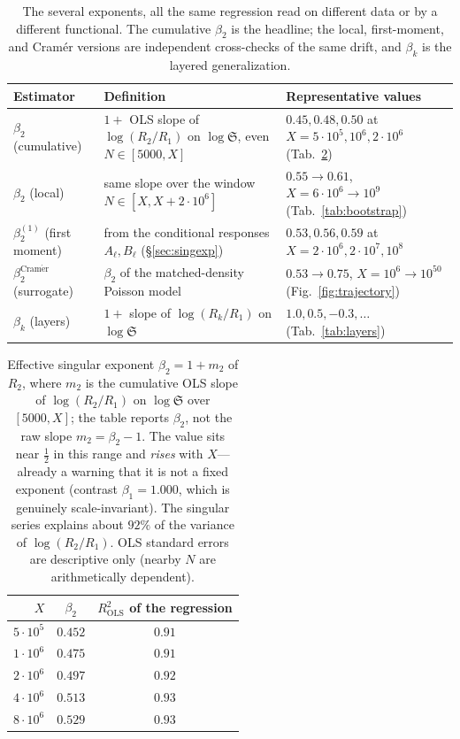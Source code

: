 \documentclass[]{interact}%
\newcommand{\sing}{\mathfrak S}
\begin{document}
\begin{table}[h]
\centering
\small
\begin{tabular}{@{}>{\raggedright\arraybackslash}p{2.7cm} >{\raggedright\arraybackslash}p{5.0cm} >{\raggedright\arraybackslash}p{4.3cm}@{}}
\toprule
Estimator & Definition & Representative values\\
\midrule
$\beta_2$ (cumulative) & $1+$ OLS slope of $\log(R_2/R_1)$ on $\log\sing$, even $N\in[5000,X]$ & $0.45,0.48,0.50$ at $X=5\!\cdot\!10^5,10^6,2\!\cdot\!10^6$ (Tab.~\ref{tab:beta})\\[2pt]
$\beta_2$ (local) & same slope over the window $N\in[X,X+2\!\cdot\!10^6]$ & $0.55\!\to\!0.61$, $X=6\!\cdot\!10^6\!\to\!10^9$ (Tab.~\ref{tab:bootstrap})\\[2pt]
$\beta_2^{(1)}$ (first moment) & from the conditional responses $A_\ell,B_\ell$ (\S\ref{sec:singexp}) & $0.53,0.56,0.59$ at $X=2\!\cdot\!10^6,2\!\cdot\!10^7,10^8$\\[2pt]
$\beta_2^{\mathrm{Cram\acute er}}$ (surrogate) & $\beta_2$ of the matched-density Poisson model & $0.53\!\to\!0.75$, $X=10^6\!\to\!10^{50}$ (Fig.~\ref{fig:trajectory})\\[2pt]
$\beta_k$ (layers) & $1+$ slope of $\log(R_k/R_1)$ on $\log\sing$ & $1.0,0.5,-0.3,\dots$ (Tab.~\ref{tab:layers})\\
\bottomrule
\end{tabular}
\caption{The several exponents, all the same regression read on different data or by a different
functional. The cumulative $\beta_2$ is the headline; the local, first-moment, and Cram\'er
versions are independent cross-checks of the same drift, and $\beta_k$ is the layered
generalization.}
\label{tab:estimators}
\end{table}

\begin{table}[h]
\centering
\begin{tabular}{rcc}
\toprule
$X$ & $\beta_2$ & $R^2_{\mathrm{OLS}}$ of the regression\\
\midrule
$5\cdot10^{5}$ & $0.452$ & $0.91$\\
$1\cdot10^{6}$ & $0.475$ & $0.91$\\
$2\cdot10^{6}$ & $0.497$ & $0.92$\\
$4\cdot10^{6}$ & $0.513$ & $0.93$\\
$8\cdot10^{6}$ & $0.529$ & $0.93$\\
\bottomrule
\end{tabular}
\caption{Effective singular exponent $\beta_2=1+m_2$ of $R_2$, where $m_2$ is the cumulative
OLS slope of $\log(R_2/R_1)$ on $\log\sing$ over $[5000,X]$; the table reports $\beta_2$, not
the raw slope $m_2=\beta_2-1$. The value sits near $\tfrac12$ in this range and \emph{rises}
with $X$---already a warning that it is not a fixed exponent (contrast $\beta_1=1.000$, which
is genuinely scale-invariant). The singular series explains about $92\%$ of the variance of
$\log(R_2/R_1)$. OLS standard errors are descriptive only (nearby $N$ are arithmetically
dependent).}
\label{tab:beta}
\end{table}
\end{document}

